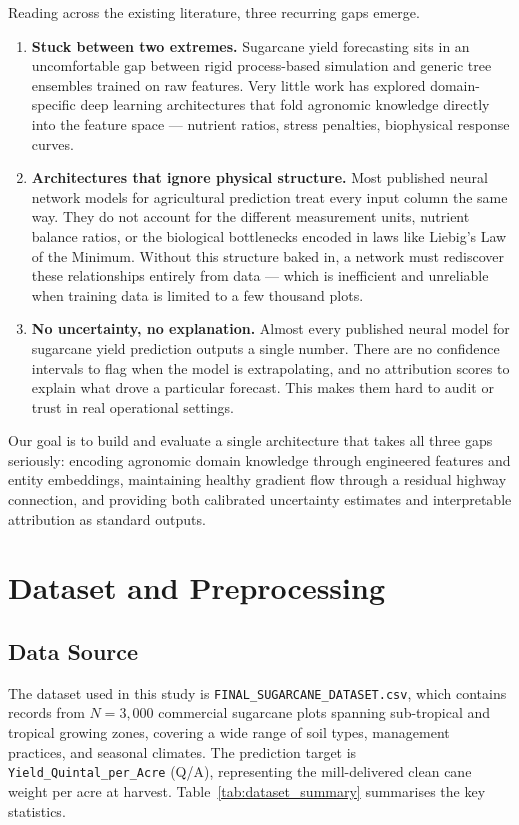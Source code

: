 \documentclass[conference,10pt,letterpaper]{IEEEtran}
\begin{document}
Reading across the existing literature, three recurring gaps emerge.
\begin{enumerate}
    \item \textbf{Stuck between two extremes.} Sugarcane yield forecasting sits in an uncomfortable gap between rigid process-based simulation and generic tree ensembles trained on raw features. Very little work has explored domain-specific deep learning architectures that fold agronomic knowledge directly into the feature space --- nutrient ratios, stress penalties, biophysical response curves.
    \item \textbf{Architectures that ignore physical structure.} Most published neural network models for agricultural prediction treat every input column the same way. They do not account for the different measurement units, nutrient balance ratios, or the biological bottlenecks encoded in laws like Liebig's Law of the Minimum. Without this structure baked in, a network must rediscover these relationships entirely from data --- which is inefficient and unreliable when training data is limited to a few thousand plots.
    \item \textbf{No uncertainty, no explanation.} Almost every published neural model for sugarcane yield prediction outputs a single number. There are no confidence intervals to flag when the model is extrapolating, and no attribution scores to explain what drove a particular forecast. This makes them hard to audit or trust in real operational settings.
\end{enumerate}

Our goal is to build and evaluate a single architecture that takes all three gaps seriously: encoding agronomic domain knowledge through engineered features and entity embeddings, maintaining healthy gradient flow through a residual highway connection, and providing both calibrated uncertainty estimates and interpretable attribution as standard outputs.

\section{Dataset and Preprocessing}

\subsection{Data Source}
The dataset used in this study is \texttt{FINAL\_SUGARCANE\_DATASET.csv}, which contains records from $N = 3{,}000$ commercial sugarcane plots spanning sub-tropical and tropical growing zones, covering a wide range of soil types, management practices, and seasonal climates. The prediction target is \texttt{Yield\_Quintal\_per\_Acre} (Q/A), representing the mill-delivered clean cane weight per acre at harvest. Table~\ref{tab:dataset_summary} summarises the key statistics.
\end{document}
